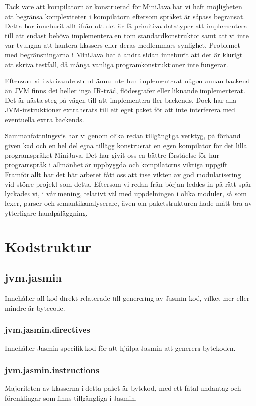 \documentclass[a4paper,11pt]{article}
\renewcommand{\*}[0]{\cdot}
\begin{document}
Tack vare att kompilatorn är konstruerad för MiniJava har vi haft möjligheten
att begränsa komplexiteten i kompilatorn eftersom språket är såpass begränsat.
Detta har inneburit allt ifrån att det är få primitiva datatyper att
implementera till att endast behöva implementera en tom standardkonstruktor
samt att vi inte var tvungna att hantera klassers eller deras medlemmars
synlighet. Problemet med begränsningarna i MiniJava har å andra sidan inneburit
att det är klurigt att skriva testfall, då många vanliga programkonstruktioner
inte fungerar.

Eftersom vi i skrivande stund ännu inte har implementerat någon annan backend
än JVM finns det heller inga IR-träd, flödesgrafer eller liknande
implementerat. Det är nästa steg på vägen till att implementera fler backends.
Dock har alla JVM-instruktioner extraherats till ett eget paket för att inte
interferera med eventuella extra backends.

Sammanfattningsvis har vi genom olika redan tillgängliga verktyg, på förhand
given kod och en hel del egna tillägg konstruerat en egen kompilator för det
lilla programspråket MiniJava. Det har givit oss en bättre förståelse för hur
programspråk i allmänhet är uppbyggda och kompilatorns viktiga uppgift. Framför
allt har det här arbetet fått oss att inse vikten av god modularisering vid
större projekt som detta. Eftersom vi redan från början leddes in på rätt spår
lyckades vi, i vår mening, relativt väl med uppdelningen i olika moduler, så
som lexer, parser och semantikanalyserare, även om paketstrukturen hade mått
bra av ytterligare handpåläggning.


\appendix
\section{Kodstruktur}
\subsection*{jvm.jasmin}
Innehåller all kod direkt relaterade till generering av Jasmin-kod, vilket mer
eller mindre är bytecode.
\subsubsection*{jvm.jasmin.directives}
Innehåller Jasmin-specifik kod för att hjälpa Jasmin att generera bytekoden.
\subsubsection*{jvm.jasmin.instructions}
Majoriteten av klasserna i detta paket är bytekod, med ett fåtal undantag och
förenklingar som finns tillgängliga i Jasmin.
\end{document}
